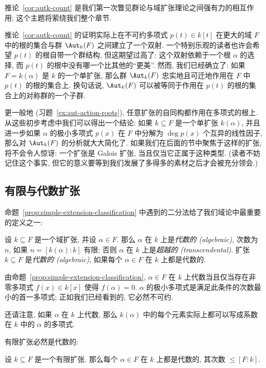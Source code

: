 推论~\ref{cor:autk-count} 是我们第一次瞥见群论与域扩张理论之间强有力的相互作用; 这个主题将萦绕我们整个章节.

推论~\ref{cor:autk-count} 的证明实际上在不可约多项式 $p(t)\in k[t]$ 在更大的域 $F$ 中的根的集合与群 $\Aut_k(F)$ 之间建立了一个双射. 一个特别乐观的读者也许会希望 $p(t)$ 的根自带一个群结构, 但这期望过高了: 这个双射依赖于一个根 $\alpha$ 的选择, 而 $p(t)$ 的根中没有哪一个比其他的``更美''. 然而, 我们已经确立了: 如果 $F=k(\alpha)$ 是 $k$ 的一个单扩张, 那么群 $\Aut_k(F)$ 忠实地且可迁地作用在 $F$ 中 $p(t)$ 的根的集合上. 换句话说, $\Aut_k(F)$ 可以被等同于作用在 $p(t)$ 的根的集合上的对称群的一个子群.

更一般地 (习题~\ref{ex:aut-action-roots}), 任意扩张的自同构都作用在多项式的根上. 从这些初步考虑中我们可以得出一个结论: 如果 $k\subseteq F$ 是一个单扩张 $k(\alpha)$, 并且进一步如果 $\alpha$ 的极小多项式 $p(x)$ 在 $F$ 中分解为 $\deg p(x)$ 个互异的线性因子, 那么对 $\Aut_k(F)$ 的分析就大大简化了. 如果我们在后面的节中聚焦于这样的扩张, 将不会令人惊讶: 一个扩张是 Galois 扩张, 当且仅当它正属于这种类型. (读者不妨记住这个事实, 但它的意义要等到我们发展了多得多的素材之后才会被充分领会.)

\subsection{有限与代数扩张}
\label{subsec:finite-algebraic}

命题~\ref{prop:simple-extension-classification} 中遇到的二分法给了我们域论中最重要的定义之一:

\begin{definition}\label{def:algebraic}
设 $k\subseteq F$ 是一个域扩张, 并设 $\alpha\in F$. 那么 $\alpha$ 在 $k$ 上是\emph{代数的 (algebraic)}, 次数为 $n$, 如果 $n=[k(\alpha):k]$ 有限; 否则 $\alpha$ 在 $k$ 上是\emph{超越的 (transcendental)}.
扩张 $k\subseteq F$ 是\emph{代数的 (algebraic)}, 如果每个 $\alpha\in F$ 在 $k$ 上都是代数的.
\end{definition}

由命题~\ref{prop:simple-extension-classification}, $\alpha\in F$ 在 $k$ 上代数当且仅当存在非零多项式 $f(x)\in k[x]$ 使得 $f(\alpha)=0$. $\alpha$ 的极小多项式是满足此条件的次数最小的首一多项式; 正如我们已经看到的, 它必然不可约.

还请注意, 如果 $\alpha$ 在 $k$ 上代数, 那么 $k(\alpha)$ 中的每个元素实际上都可以写成系数在 $k$ 中的 $\alpha$ 的多项式.

有限扩张必然是代数的:

\begin{lemma}\label{lem:finite-algebraic}
设 $k\subseteq F$ 是一个有限扩张. 那么每个 $\alpha\in F$ 在 $k$ 上都是代数的, 其次数 $\leq [F:k]$.
\end{lemma}

